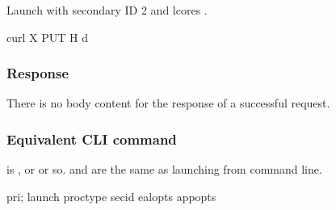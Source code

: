 \documentclass[a4paper,11pt,openany,oneside,english]{sphinxmanual}
\begin{document}
Launch  with secondary ID 2 and lcores .

\begin{sphinxVerbatim}[commandchars=\\\{\},formatcom=\footnotesize]
 curl \PYGZhy{}X PUT \PYGZhy{}H  
  \PYGZhy{}d 
\end{sphinxVerbatim}


\subsubsection{Response}
\label{\detokenize{api_ref/spp_primary:id19}}
There is no body content for the response of a successful  request.


\subsubsection{Equivalent CLI command}
\label{\detokenize{api_ref/spp_primary:id20}}
 is ,  or  or so.
 and  are the same as launching from command line.

\begin{sphinxVerbatim}[commandchars=\\\{\},formatcom=\footnotesize]
pri; launch \PYGZob{}proc\PYGZus{}type\PYGZcb{} \PYGZob{}sec\PYGZus{}id\PYGZcb{} \PYGZob{}eal\PYGZus{}opts\PYGZcb{} \PYGZhy{}\PYGZhy{} \PYGZob{}app\PYGZus{}opts\PYGZcb{}
\end{sphinxVerbatim}
\end{document}
